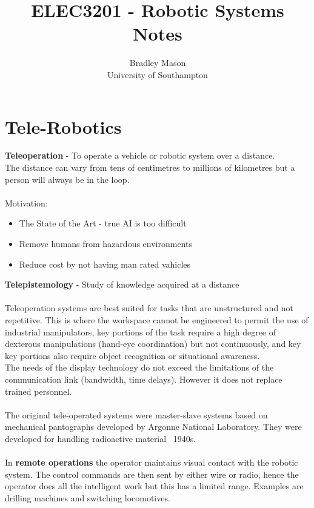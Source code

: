 \documentclass{article}
\begin{document}
	\title{ELEC3201 - Robotic Systems\\Notes}
	\author{Bradley Mason\\ University of Southampton}
	\maketitle
	\newpage
	
	\tableofcontents
	\newpage
	\section*{Tele-Robotics}
	\pagestyle{headings}
	{\bfseries Teleoperation} - To operate a vehicle or robotic system over a distance.\\
	The distance can vary from tens of centimetres to millions of kilometres but a person will always be in the loop.\\
	\\Motivation:
	\begin{itemize}
		\item The State of the Art - true AI is too difficult
		\item Remove humans from hazardous environments
		\item Reduce cost by not having man rated vahicles
	\end{itemize}
	{\bfseries Telepistemology} - Study of knowledge acquired at a distance\\
	\\Teleoperation systems are best suited for tasks that are unstructured and not repetitive. This is where the workspace cannot be engineered to permit the use of industrial manipulators, key portions of the task require a high degree of dexterous manipulations  (hand-eye coordination) but not continuously, and key key portions also require object recognition or situational awareness.\\
	The needs of the display technology do not exceed the limitations of the communication link (bandwidth, time delays). However it does not replace trained personnel.\\
	\\ The original tele-operated systems were master-slave systems based on mechanical pantographs developed by Argonne National Laboratory. They were developed for handling radioactive material ~1940s.\\
	\\In {\bfseries remote operations} the operator maintains visual contact with the robotic system. The control commands are then sent by either wire or radio, hence the operator does all the intelligent work but this has a limited range. Examples are drilling machines and switching locomotives.\\
\end{document}
